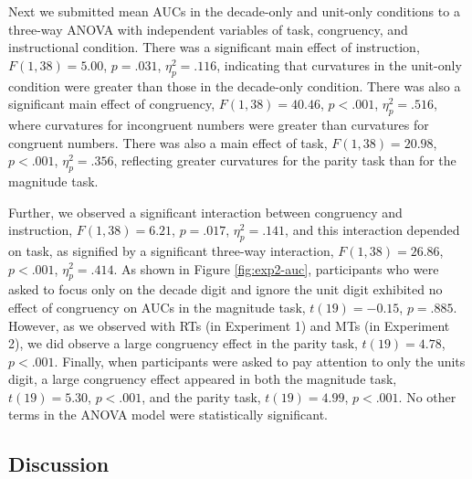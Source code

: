 \documentclass[english,man]{apa6}
\theoremstyle{definition}
\theoremstyle{definition}
\theoremstyle{definition}
\theoremstyle{remark}
\begin{document}
Next we submitted mean AUCs in the decade-only and unit-only conditions
to a three-way ANOVA with independent variables of task, congruency, and
instructional condition. There was a significant main effect of
instruction, \(F(1, 38) = 5.00\), \(p = .031\), \(\eta^2_p = .116\),
indicating that curvatures in the unit-only condition were greater than
those in the decade-only condition. There was also a significant main
effect of congruency, \(F(1, 38) = 40.46\), \(p < .001\),
\(\eta^2_p = .516\), where curvatures for incongruent numbers were
greater than curvatures for congruent numbers. There was also a main
effect of task, \(F(1, 38) = 20.98\), \(p < .001\), \(\eta^2_p = .356\),
reflecting greater curvatures for the parity task than for the magnitude
task.

Further, we observed a significant interaction between congruency and
instruction, \(F(1, 38) = 6.21\), \(p = .017\), \(\eta^2_p = .141\), and
this interaction depended on task, as signified by a significant
three-way interaction, \(F(1, 38) = 26.86\), \(p < .001\),
\(\eta^2_p = .414\). As shown in Figure \ref{fig:exp2-auc}, participants
who were asked to focus only on the decade digit and ignore the unit
digit exhibited no effect of congruency on AUCs in the magnitude task,
\(t(19) = -0.15\), \(p = .885\). However, as we observed with RTs (in
Experiment 1) and MTs (in Experiment 2), we did observe a large
congruency effect in the parity task, \(t(19) = 4.78\), \(p < .001\).
Finally, when participants were asked to pay attention to only the units
digit, a large congruency effect appeared in both the magnitude task,
\(t(19) = 5.30\), \(p < .001\), and the parity task, \(t(19) = 4.99\),
\(p < .001\). No other terms in the ANOVA model were statistically
significant.

\subsection{Discussion}\label{discussion-1}
\end{document}
